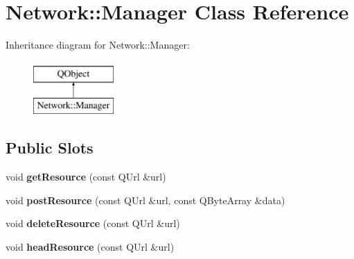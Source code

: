 \hypertarget{classNetwork_1_1Manager}{}\section{Network\+:\+:Manager Class Reference}
\label{classNetwork_1_1Manager}
Inheritance diagram for Network\+:\+:Manager\+:\begin{figure}[H]
\begin{center}
\leavevmode
\includegraphics[height=2.000000cm]{classNetwork_1_1Manager}
\end{center}
\end{figure}
\subsection*{Public Slots}
\begin{DoxyCompactItemize}
\item 
\mbox{\label{classNetwork_1_1Manager_aa8df583727aa598ee39e6de18b438abe}} 
void {\bfseries get\+Resource} (const Q\+Url \&url)
\item 
\mbox{\label{classNetwork_1_1Manager_a88e7de8604594cf6c2689e8b7a0a6e6e}} 
void {\bfseries post\+Resource} (const Q\+Url \&url, const Q\+Byte\+Array \&data)
\item 
\mbox{\label{classNetwork_1_1Manager_adef1a35e5066157068800847c9366c09}} 
void {\bfseries delete\+Resource} (const Q\+Url \&url)
\item 
\mbox{\label{classNetwork_1_1Manager_a42ef9df33cf238b62e66a5759c316432}} 
void {\bfseries head\+Resource} (const Q\+Url \&url)
\end{DoxyCompactItemize}
